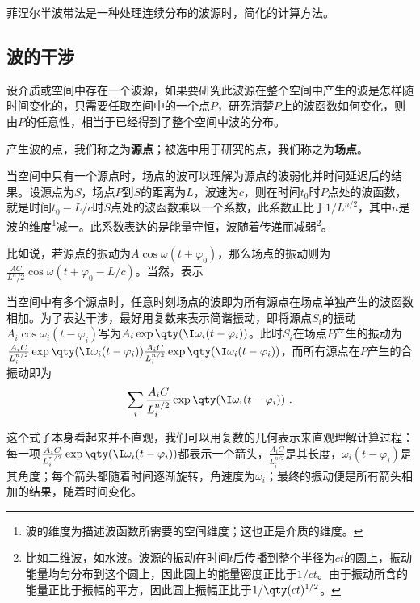 


菲涅尔半波带法是一种处理连续分布的波源时，简化的计算方法。



\subsection{波的干涉}


设介质或空间中存在一个波源，如果要研究此波源在整个空间中产生的波是怎样随时间变化的，只需要任取空间中的一个点$P$，研究清楚$P$上的波函数如何变化，则由$P$的任意性，相当于已经得到了整个空间中波的分布。

产生波的点，我们称之为\textbf{源点}；被选中用于研究的点，我们称之为\textbf{场点}。

当空间中只有一个源点时，场点的波可以理解为源点的波弱化并时间延迟后的结果。设源点为$S$，场点$P$到$S$的距离为$L$，波速为$c$，则在时间$t_0$时$P$点处的波函数，就是时间$t_0-L/c$时$S$点处的波函数乘以一个系数，此系数正比于$1/L^{n/2}$，其中$n$是波的维度\footnote{波的维度为描述波函数所需要的空间维度；这也正是介质的维度。}减一。此系数表达的是能量守恒，波随着传递而减弱\footnote{比如二维波，如水波。波源的振动在时间$t$后传播到整个半径为$ct$的圆上，振动能量均匀分布到这个圆上，因此圆上的能量密度正比于$1/ct$。由于振动所含的能量正比于振幅的平方，因此圆上振幅正比于$1/\qty(ct)^{1/2}$。}。

比如说，若源点的振动为$A\cos \omega (t+\varphi_0)$，那么场点的振动则为$\frac{AC}{L^n/2}\cos \omega(t+\varphi_0-L/c)$。当然，表示

当空间中有多个源点时，任意时刻场点的波即为所有源点在场点单独产生的波函数相加。为了表达干涉，最好用复数来表示简谐振动，即将源点$S_i$的振动$A_i\cos\omega_i(t-\varphi_i)$写为$A_i\exp\qty(\I\omega_i(t-\varphi_i))$。此时$S_i$在场点$P$产生的振动为$\frac{A_iC}{L_i^{n/2}}\exp\qty(\I\omega_i(t-\varphi_i))\frac{A_iC}{L_i^{n/2}}\exp\qty(\I\omega_i(t-\varphi_i))$，而所有源点在$P$产生的合振动即为
\begin{equation}
\sum_i \frac{A_iC}{L_i^{n/2}}\exp\qty(\I\omega_i(t-\varphi_i))~. 
\end{equation}

这个式子本身看起来并不直观，我们可以用复数的几何表示来直观理解计算过程：每一项$\frac{A_iC}{L_i^{n/2}}\exp\qty(\I\omega_i(t-\varphi_i))$都表示一个箭头，$\frac{A_iC}{L_i^{n/2}}$是其长度，$\omega_i(t-\varphi_i)$是其角度；每个箭头都随着时间逐渐旋转，角速度为$\omega_i$；最终的振动便是所有箭头相加的结果，随着时间变化。



